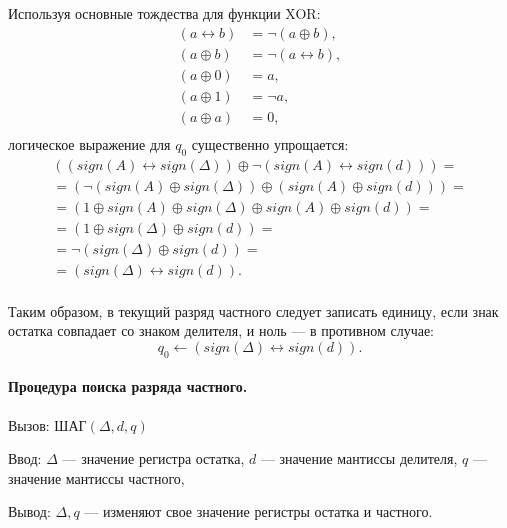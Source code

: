 Используя основные тождества для функции XOR:
\begin{align*}
    (a\leftrightarrow b) & = \lnot(a\oplus b),\\
    (a\oplus b)          & = \lnot(a\leftrightarrow b),\\
    (a\oplus 0)          & = a,\\
    (a\oplus 1)          & = \lnot a,\\
    (a\oplus a)          & = 0,\\
\end{align*}
логическое выражение для $q_0$ существенно упрощается:
\begin{align*}
    ((sign(A)\leftrightarrow sign(\Delta))\oplus \lnot(sign(A)\leftrightarrow sign(d)))=\\
    =(\lnot(sign(A)\oplus sign(\Delta))\oplus (sign(A)\oplus sign(d)))=\\
    =(1\oplus sign(A) \oplus sign(\Delta) \oplus sign(A)\oplus sign(d))=\\
    =(1\oplus sign(\Delta) \oplus sign(d))=\\
    =\lnot(sign(\Delta) \oplus sign(d))=\\
    =(sign(\Delta) \leftrightarrow sign(d)).\\
\end{align*}

Таким образом, в текущий разряд частного следует записать единицу, если знак остатка совпадает со знаком делителя, и ноль --- в противном случае:
\[
    q_0\gets(sign(\Delta) \leftrightarrow sign(d)).
\]


\paragraph{Процедура поиска разряда частного.}

Вызов: $\text{ШАГ}(\Delta,d,q)$

Ввод: $\Delta$ --- значение регистра остатка, $d$ --- значение мантиссы делителя, $q$ --- значение мантиссы частного,

Вывод: $\Delta,q$ --- изменяют свое значение регистры остатка и частного.

